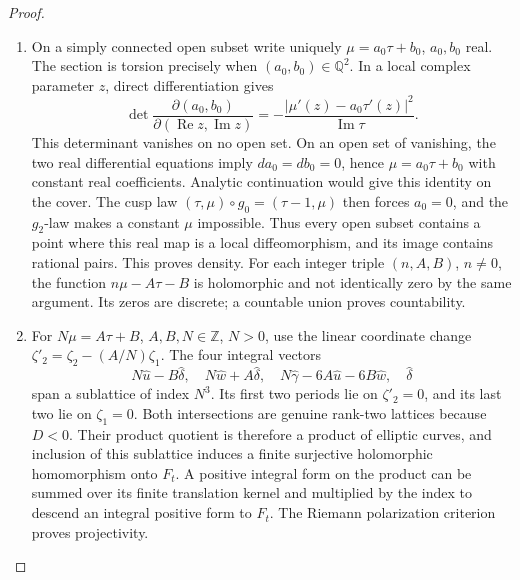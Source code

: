 \begin{proof}
\begin{enumerate}[label=\arabic*.,leftmargin=*]
\item \label{app:rederive:fam-src-D.1.2}
On a simply connected open subset write uniquely
\(\mu=a_0\tau+b_0\), \(a_0,b_0\) real. The section is torsion precisely
when \((a_0,b_0)\in\mathbb Q^2\). In a local complex parameter \(z\), direct
differentiation gives
\[
 \det\frac{\partial(a_0,b_0)}{\partial(\operatorname{Re}z,
 \operatorname{Im}z)}
 =-\frac{|\mu'(z)-a_0\tau'(z)|^2}{\operatorname{Im}\tau}.
\]
This determinant vanishes on no open set. On an open set of vanishing,
the two real differential equations imply \(da_0=db_0=0\), hence
\(\mu=a_0\tau+b_0\) with constant real coefficients. Analytic continuation
would give this identity on the cover. The cusp law
\((\tau,\mu)\circ g_0=(\tau-1,\mu)\) then forces \(a_0=0\), and the
\(g_2\)-law makes a constant \(\mu\) impossible. Thus every open subset
contains a point where this real map is a local diffeomorphism, and its
image contains rational pairs. This proves density. For each integer
triple \((n,A,B)\), \(n\ne0\), the function \(n\mu-A\tau-B\) is
holomorphic and not identically zero by the same argument. Its zeros are
discrete; a countable union proves countability.

\item For \(N\mu=A\tau+B\), \(A,B,N\in\mathbb Z\), \(N>0\), use the linear
coordinate change \(\zeta'_2=\zeta_2-(A/N)\zeta_1\).
The four integral vectors
\[
 N\widehat u-B\widehat\delta,\quad
 N\widehat w+A\widehat\delta,\quad
 N\widehat\gamma-6A\widehat u-6B\widehat w,\quad
 \widehat\delta
\]
span a sublattice of index \(N^3\). Its first two periods lie on
\(\zeta'_2=0\), and its last two lie on \(\zeta_1=0\).
Both intersections are genuine rank-two lattices because \(D<0\).
Their product quotient is therefore a product of elliptic curves, and
inclusion of this sublattice induces a finite surjective holomorphic
homomorphism onto \(F_t\). A positive integral form on the product can
be summed over its finite translation kernel and multiplied by the
index to descend an integral positive form to \(F_t\). The Riemann
polarization criterion proves projectivity.


\end{enumerate}
\end{proof}
